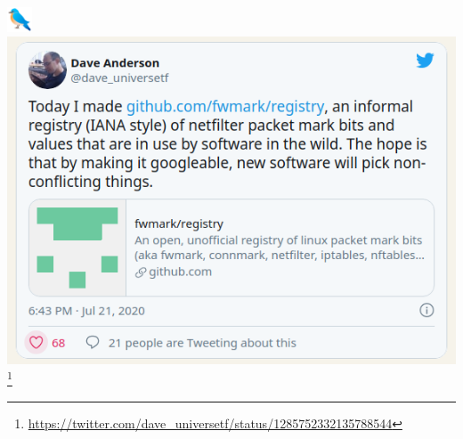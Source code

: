 \documentclass[black,white,aspectratio=169]{beamer}
\newcommand\blfootnote[1]{%
  \begingroup
  \renewcommand\thefootnote{}\footnote{#1}%
  \addtocounter{footnote}{-1}%
  \endgroup
}
\DeclareRobustCommand{\#}{\adjustbox{valign=B,totalheight=.57\baselineskip}{\oldhash}}%
\begin{document}
    \begin{frame}{\includegraphics[height=2em]{bird.png}}
        \centering
        \includegraphics[height=0.5\textheight]{fwmark_tweet.png}%
        \blfootnote{{\tiny \url{https://twitter.com/dave_universetf/status/1285752332135788544}}}
    \end{frame}
\end{document}
